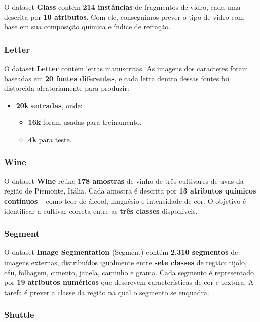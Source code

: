 \documentclass{article}
\begin{document}
O dataset \textbf{Glass} contém \textbf{214 instâncias} de fragmentos de vidro, cada uma descrita por \textbf{10 atributos}. Com ele, conseguimos prever o tipo de vidro com base em sua composição química e índice de refração.

\subsubsection{Letter}

O dataset \textbf{Letter} contém letras manuscritas. As imagens dos caracteres foram baseadas em \textbf{20 fontes diferentes}, e cada letra dentro dessas fontes foi distorcida aleatoriamente para produzir:

\begin{itemize}
    \item \textbf{20k entradas}, onde:
    \begin{itemize}
        \item \textbf{16k} foram usadas para treinamento.
        \item \textbf{4k} para teste.
    \end{itemize}
\end{itemize}

\subsubsection{Wine}

O dataset \textbf{Wine} reúne \textbf{178 amostras} de vinho de três cultivares de uvas da região de Piemonte, Itália. Cada amostra é descrita por \textbf{13 atributos químicos contínuos} – como teor de álcool, magnésio e intensidade de cor. O objetivo é identificar a cultivar correta entre as \textbf{três classes} disponíveis.

\subsubsection{Segment}

O dataset \textbf{Image Segmentation} (Segment) contém \textbf{2.310 segmentos} de imagens externas, distribuídos igualmente entre \textbf{sete classes} de região: tijolo, céu, folhagem, cimento, janela, caminho e grama. Cada segmento é representado por \textbf{19 atributos numéricos} que descrevem características de cor e textura. A tarefa é prever a classe da região na qual o segmento se enquadra.

\subsubsection{Shuttle}
\end{document}
